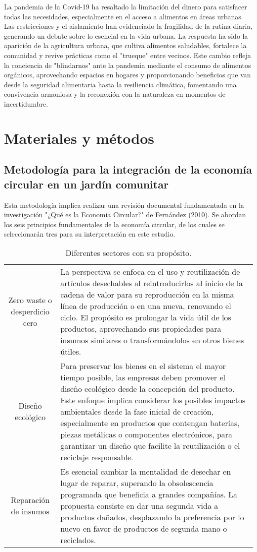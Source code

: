 \documentclass[12pt]{article}
\begin{document}
La pandemia de la Covid-19 ha resaltado la limitación del dinero para satisfacer todas las necesidades, especialmente en el acceso a alimentos en áreas urbanas. Las restricciones y el aislamiento han evidenciado la fragilidad de la rutina diaria, generando un debate sobre lo esencial en la vida urbana. La respuesta ha sido la aparición de la agricultura urbana, que cultiva alimentos saludables, fortalece la comunidad y revive prácticas como el "trueque" entre vecinos. Este cambio refleja la conciencia de "blindarnos" ante la pandemia mediante el consumo de alimentos orgánicos, aprovechando espacios en hogares y proporcionando beneficios que van desde la seguridad alimentaria hasta la resiliencia climática, fomentando una convivencia armoniosa y la reconexión con la naturaleza en momentos de incertidumbre. \\
\newpage
\section{Materiales y métodos}
\subsection{Metodología para la integración de la economía circular en un jardín comunitar}
Esta metodología implica realizar una revisión documental fundamentada en la investigación "¿Qué es la Economía Circular?" de Fernández (2010). Se abordan los seis principios fundamentales de la economía circular, de los cuales se seleccionarán tres para su interpretación en este estudio.
\begin{table}[h]
	\centering
	\caption{Diferentes sectores con su propósito.}
	\begin{tabular}{|c|p{10cm}|}
		\hline
		&  \\
		\hline
		Zero waste o desperdicio cero & La perspectiva se enfoca en el uso y reutilización de artículos desechables al reintroducirlos al inicio de la cadena de valor para su reproducción en la misma línea de producción o en una nueva, renovando el ciclo. El propósito es prolongar la vida útil de los productos, aprovechando sus propiedades para insumos similares o transformándolos en otros bienes útiles. \\
		\hline
		Diseño ecológico & Para preservar los bienes en el sistema el mayor tiempo posible, las empresas deben promover el diseño ecológico desde la concepción del producto. Este enfoque implica considerar los posibles impactos ambientales desde la fase inicial de creación, especialmente en productos que contengan baterías, piezas metálicas o componentes electrónicos, para garantizar un diseño que facilite la reutilización o el reciclaje responsable. \\
		\hline
		Reparación de insumos & Es esencial cambiar la mentalidad de desechar en lugar de reparar, superando la obsolescencia programada que beneficia a grandes compañías. La propuesta consiste en dar una segunda vida a productos dañados, desplazando la preferencia por lo nuevo en favor de productos de segunda mano o reciclados. \\
		\hline
	\end{tabular}
\end{table} 
\newpage
\printbibliography[heading=bibintoc]
\end{document}
